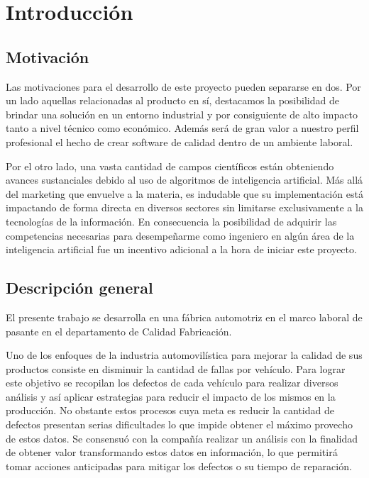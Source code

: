 \documentclass[a4paper,12pt]{article}
\begin{document}
\section{Introducción}

\subsection{Motivación}
Las motivaciones para el desarrollo de este proyecto pueden separarse en dos. Por un lado aquellas relacionadas al producto en sí, destacamos la posibilidad de brindar una solución en un entorno industrial y por consiguiente de alto impacto tanto a nivel técnico como económico. Además será de gran valor a nuestro perfil profesional el hecho de crear software de calidad dentro de un ambiente laboral.

Por el otro lado, una vasta cantidad de campos científicos están obteniendo avances sustanciales debido al uso de algoritmos de inteligencia artificial. Más allá del marketing que envuelve a la materia, es indudable que su implementación está impactando de forma directa en diversos sectores sin limitarse exclusivamente a la tecnologías de la información. En consecuencia la posibilidad de adquirir las competencias necesarias para desempeñarme como ingeniero en algún área de la inteligencia artificial fue un incentivo adicional a la hora de iniciar este proyecto.

\subsection{Descripción general}

El presente trabajo se desarrolla en una fábrica automotriz en el marco laboral de pasante en el departamento de Calidad Fabricación.

Uno de los enfoques de la industria automovilística para mejorar la calidad de sus productos consiste en disminuir la cantidad de fallas por vehículo. Para lograr este objetivo se recopilan los defectos de cada vehículo para realizar diversos análisis y así aplicar estrategias para reducir el impacto de los mismos en la producción. No obstante estos procesos cuya meta es reducir la cantidad de defectos presentan serias dificultades lo que impide obtener el máximo provecho de estos datos. Se consensuó con la compañía realizar un análisis con la finalidad de obtener valor transformando estos datos en información, lo que permitirá tomar acciones anticipadas para mitigar los defectos o su tiempo de reparación.
\end{document}
